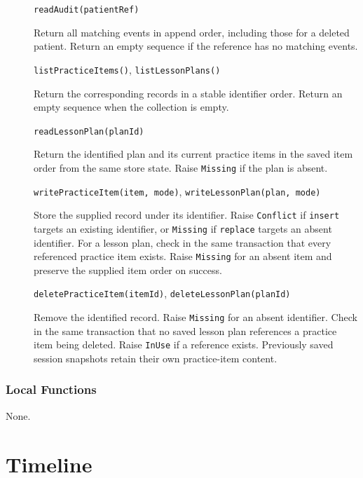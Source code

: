 \documentclass[12pt, titlepage]{article}
\begin{document}
\begin{description}
\item[] \texttt{readAudit(patientRef)}\par
Return all matching events in append order, including those for a deleted
patient. Return an empty sequence if the reference has no matching events.

\item[] \texttt{listPracticeItems()}, \texttt{listLessonPlans()}\par
Return the corresponding records in a stable identifier order. Return an
empty sequence when the collection is empty.

\item[] \texttt{readLessonPlan(planId)}\par
Return the identified plan and its current practice items in the saved item
order from the same store state. Raise \texttt{Missing} if the plan is absent.

\item[] \texttt{writePracticeItem(item, mode)}, \texttt{writeLessonPlan(plan, mode)}\par
Store the supplied record under its identifier. Raise \texttt{Conflict} if
\texttt{insert} targets an existing identifier, or \texttt{Missing} if
\texttt{replace} targets an absent identifier. For a lesson plan, check in
the same transaction that every referenced practice item exists. Raise
\texttt{Missing} for an absent item and preserve the supplied item order on
success.

\item[] \texttt{deletePracticeItem(itemId)}, \texttt{deleteLessonPlan(planId)}\par
Remove the identified record. Raise \texttt{Missing} for an absent
identifier. Check in the same transaction that no saved lesson plan
references a practice item being deleted. Raise \texttt{InUse} if a
reference exists. Previously saved session snapshots retain their own
practice-item content.
\end{description}

\subsubsection{Local Functions}
None.

\clearpage

\section{Timeline}
\end{document}
